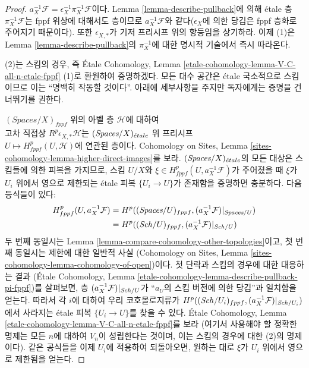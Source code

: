 \begin{proof}
$a_X^{-1}\mathcal{F} = \epsilon_X^{-1} \pi_X^{-1}\mathcal{F}$이다.
Lemma \ref{lemma-describe-pullback}에 의해 \'etale 층
$\pi_X^{-1}\mathcal{F}$는 fppf 위상에 대해서도 층이므로
$a_X^{-1}\mathcal{F}$와 같다($\epsilon_X$에 의한 당김은 fppf 층화로
주어지기 때문이다). 또한 $\epsilon_{X, *}$가 기저 프리시프 위의
항등임을 상기하라. 이제 (1)은 Lemma
\ref{lemma-describe-pullback}의 $\pi_X^{-1}$에 대한 명시적 기술에서
즉시 따라온다.

\medskip\noindent
(2)는 스킴의 경우, 즉 \'Etale Cohomology, Lemma
\ref{etale-cohomology-lemma-V-C-all-n-etale-fppf} (1)로 환원하여
증명하겠다. 모든 대수 공간은 \'etale 국소적으로 스킴이므로 이는
``명백히 작동할 것이다''. 아래에 세부사항을 주지만 독자에게는
증명을 건너뛰기를 권한다.

\medskip\noindent
$(\textit{Spaces}/X)_{fppf}$ 위의 아벨 층 $\mathcal{H}$에 대하여\\
고차 직접상 $R^p\epsilon_{X, *}\mathcal{H}$는
$(\textit{Spaces}/X)_{\acute{e}tale}$ 위 프리시프\\
$U \mapsto H^p_{fppf}(U, \mathcal{H})$에 연관된 층이다.
Cohomology on Sites, Lemma
\ref{sites-cohomology-lemma-higher-direct-images}를 보라.
$(\textit{Spaces}/X)_{\acute{e}tale}$의 모든 대상은 스킴들에 의한 피복을 가지므로,
스킴 $U/X$와
$\xi \in H^p_{fppf}(U, a_X^{-1}\mathcal{F})$가 주어졌을 때
$\xi$가 $U_i$ 위에서 영으로 제한되는 \'etale 피복
$\{U_i \to U\}$가 존재함을 증명하면 충분하다. 다음 등식들이 있다:
\begin{align*}
H^p_{fppf}(U, a_X^{-1}\mathcal{F})
& =
H^p((\textit{Spaces}/U)_{fppf}, (a_X^{-1}\mathcal{F})|_{\textit{Spaces}/U}) \\
& =
H^p((\mathit{Sch}/U)_{fppf}, (a_X^{-1}\mathcal{F})|_{\mathit{Sch}/U})
\end{align*}
두 번째 동일시는 Lemma
\ref{lemma-compare-cohomology-other-topologies}이고, 첫 번째 동일시는
제한에 대한 일반적 사실
(Cohomology on Sites, Lemma
\ref{sites-cohomology-lemma-cohomology-of-open})이다.
첫 단락과 스킴의 경우에 대한 대응하는 결과
(\'Etale Cohomology, Lemma
\ref{etale-cohomology-lemma-describe-pullback-pi-fppf})를 살펴보면,
층 $(a_X^{-1}\mathcal{F})|_{\mathit{Sch}/U}$가 ``$a_U$의 스킴 버전에 의한
당김''과 일치함을 얻는다. 따라서 각 $i$에 대하여 우리 코호몰로지류가
$H^p((\mathit{Sch}/U_i)_{fppf}, (a_X^{-1}\mathcal{F})|_{\mathit{Sch}/U_i})$에서
사라지는 \'etale 피복 $\{U_i \to U\}$를 찾을 수 있다.
\'Etale Cohomology, Lemma
\ref{etale-cohomology-lemma-V-C-all-n-etale-fppf}를 보라
(여기서 사용해야 할 정확한 명제는 모든 $n$에 대하여 $V_n$이
성립한다는 것이며, 이는 스킴의 경우에 대한 (2)의 명제이다).
같은 공식들을 이제 $U_i$에 적용하여 되돌아오면, 원하는 대로
$\xi$가 $U_i$ 위에서 영으로 제한됨을 얻는다.
\end{proof}

